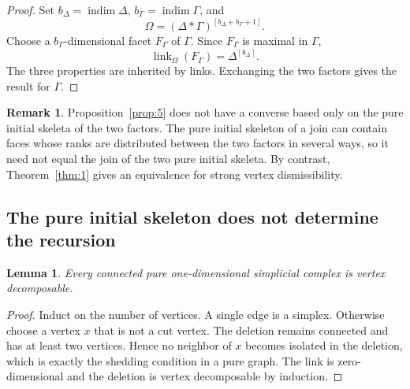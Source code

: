 \documentclass[11pt]{amsart}
\DeclareMathOperator{\indim}{indim}
\DeclareMathOperator{\link}{link}
\newtheorem{lemma}[theorem]{Lemma}
\theoremstyle{definition}
\newtheorem{remark}[theorem]{Remark}
\begin{document}
	\begin{proof}
		Set $b_\Delta=\indim\Delta$, $b_\Gamma=\indim\Gamma$, and
		\[
		\Omega=(\Delta*\Gamma)^{[b_\Delta+b_\Gamma+1]}.
		\]
		Choose a $b_\Gamma$-dimensional facet $F_\Gamma$ of $\Gamma$.  Since $F_\Gamma$ is maximal in $\Gamma$,
		\[
		\link_\Omega(F_\Gamma)=\Delta^{[b_\Delta]}.
		\]
		The three properties are inherited by links.  Exchanging the two factors gives the result for $\Gamma$.
	\end{proof}
	
	\begin{remark}\label{rem:3}
		Proposition~\ref{prop:5} does not have a converse based only on the pure initial skeleta of the two factors. The pure initial skeleton of a join can contain faces whose ranks are distributed between the two factors in several ways, so it need not equal the join of the two pure initial skeleta.  By contrast, Theorem~\ref{thm:1} gives an equivalence for strong vertex dismissibility.
	\end{remark}
	
	\subsection{The pure initial skeleton does not determine the recursion}
	
	\begin{lemma}\label{lem:4}
		Every connected pure one-dimensional simplicial complex is vertex decomposable.
	\end{lemma}
	
	\begin{proof}
		Induct on the number of vertices.  A single edge is a simplex.  Otherwise choose a vertex $x$ that is not a cut vertex.  The deletion remains connected and has at least two vertices.  Hence no neighbor of $x$ becomes isolated in the deletion, which is exactly the shedding condition in a pure graph.  The link is zero-dimensional and the deletion is vertex decomposable by induction.
	\end{proof}
	
\end{document}
